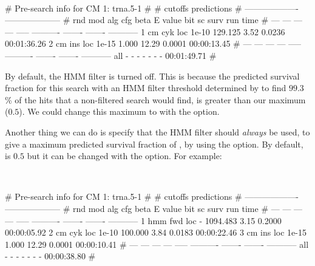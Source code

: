 \\

\begin{sreoutput}
# Pre-search info for CM 1: trna.5-1
#
#                                  cutoffs            predictions     
#                            -------------------  --------------------
# rnd  mod  alg  cfg   beta     E value   bit sc     surv     run time
# ---  ---  ---  ---  -----  ----------  -------  -------  -----------
    1   cm  cyk  loc  1e-10     129.125     3.52   0.0236  00:01:36.26
    2   cm  ins  loc  1e-15       1.000    12.29   0.0001  00:00:13.45
# ---  ---  ---  ---  -----  ----------  -------  -------  -----------
  all    -    -    -      -           -        -        -  00:01:49.71
#
\end{sreoutput}

By default, the HMM filter is turned off. This is because the
predicted survival fraction for this search with an HMM filter
threshold determined by  to find $99.3$\% of the
hits that a non-filtered search would find, is greater than our
maximum ($0.5$). We could change this maximum to  with the 
 option.

Another thing we can do is specify that the HMM filter should
\emph{always} be used, to give a maximum predicted survival fraction
of , by using the  option. By default,
 is $0.5$ but it can be changed with the
 option. For example:

\\

\begin{sreoutput}
# Pre-search info for CM 1: trna.5-1
#
#                                  cutoffs            predictions     
#                            -------------------  --------------------
# rnd  mod  alg  cfg   beta     E value   bit sc     surv     run time
# ---  ---  ---  ---  -----  ----------  -------  -------  -----------
    1  hmm  fwd  loc      -    1094.483     3.15   0.2000  00:00:05.92
    2   cm  cyk  loc  1e-10     100.000     3.84   0.0183  00:00:22.46
    3   cm  ins  loc  1e-15       1.000    12.29   0.0001  00:00:10.41
# ---  ---  ---  ---  -----  ----------  -------  -------  -----------
  all    -    -    -      -           -        -        -  00:00:38.80
#
\end{sreoutput}

